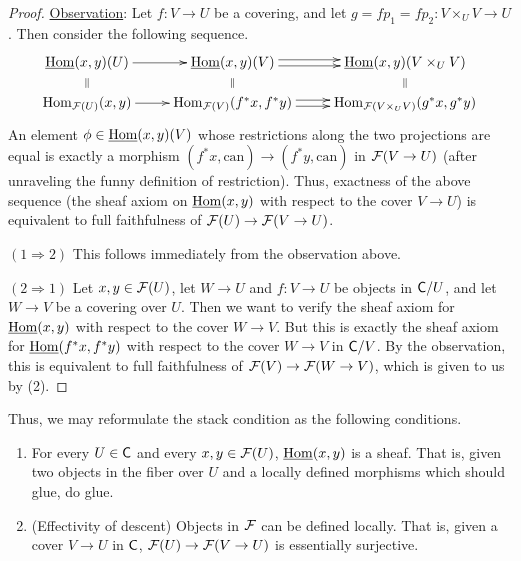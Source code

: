  \begin{proof}
%
   \underline{Observation}: Let $f:V\to U$ be a covering, and let $g=fp_1=fp_2:V\times_U
   V\to U$. Then consider the following sequence.
   \[\xymatrix@R-1pc{
    \uhom(x,y)(U) \ar@{}[d]|{\parallel}\ar[r]
     & \uhom(x,y)(V) \ar@{}[d]|{\parallel}\ar@<.5ex>[r]\ar@<-.5ex>[r]
     & \uhom(x,y)(V\times_U V) \ar@{}[d]|{\parallel} \\
    \hom_{\F(U)}(x,y) \ar[r]
     & \hom_{\F(V)}(f^*x,f^*y) \ar@<.5ex>[r]\ar@<-.5ex>[r]
     & \hom_{\F(V\times_U V)}(g^*x,g^*y)
   }\]
    An element $\phi\in \operatorname{\underline{Hom}}(x,y)(V)$ whose restrictions along the two projections are
   equal is exactly a morphism $(f^*x,\text{can})\to (f^*y,\text{can})$ in $\mathcal{F}(V\to U)$
   (after unraveling the funny definition of restriction). Thus, exactness of the above
   sequence (the sheaf axiom on $\operatorname{\underline{Hom}}(x,y)$ with respect to the cover $V\to U$) is
   equivalent to full faithfulness of $\mathcal{F}(U)\to \mathcal{F}(V\to U)$.

   \mbox{$(1\Rightarrow 2)$} This follows immediately from the observation above.

   \mbox{$(2\Rightarrow 1)$} Let $x,y\in \mathcal{F}(U)$, let $W\to U$ and $f:V\to U$ be objects in
   $\text{\sf C}/U$, and let $W\to V$ be a covering over $U$. Then we want to verify the sheaf
   axiom for $\operatorname{\underline{Hom}}(x,y)$ with respect to the cover $W\to V$. But this is exactly the
   sheaf axiom for $\operatorname{\underline{Hom}}(f^*x,f^*y)$ with respect to the cover $W\to V$ in $\text{\sf C}/V$. By
   the observation, this is equivalent to full faithfulness of $\mathcal{F}(V)\to \mathcal{F}(W\to V)$,
   which is given to us by (2).
%
 \end{proof}
 Thus, we may reformulate the stack condition as the following conditions.
 \begin{enumerate}
   \item For every $U\in \text{\sf C}$ and every $x,y\in \mathcal{F}(U)$, $\operatorname{\underline{Hom}}(x,y)$ is a sheaf. That is,
   given two objects in the fiber over $U$ and a locally defined morphisms which should
   glue, do glue.
   \item (Effectivity of descent) Objects in $\mathcal{F}$ can be defined locally. That is, given
   a cover $V\to U$ in $\text{\sf C}$, $\mathcal{F}(U)\to \mathcal{F}(V\to U)$ is essentially surjective.
 \end{enumerate}
